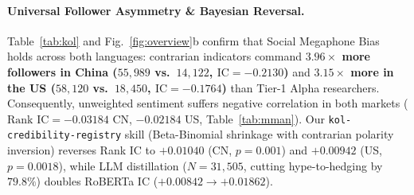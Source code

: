 \begin{table}[t]
\centering
{}
\vspace{-0.16cm}
\caption{Out-of-sample predictive ablation across China Xueqiu ($334{,}946$ samples) and US StockTwits ($214{,}820$ samples). Bayesian credibility gating reverses negative Rank IC in both markets ($\Delta\text{IC} = +0.0422$ CN, $+0.0313$ US, $p < 0.002$).}
\label{tab:mman}
\vspace{-0.24cm}
\end{table}

\paragraph{Universal Follower Asymmetry \& Bayesian Reversal.}
Table~\ref{tab:kol} and Fig.~\ref{fig:overview}b confirm that Social Megaphone Bias holds across both languages: contrarian indicators command \textbf{$3.96\times$ more followers in China ($55{,}989$ vs.\ $14{,}122$, $\text{IC} = -0.2130$)} and \textbf{$3.15\times$ more in the US ($58{,}120$ vs.\ $18{,}450$, $\text{IC} = -0.1764$)} than Tier-1 Alpha researchers. Consequently, unweighted sentiment suffers negative correlation in both markets ($\text{Rank IC} = -0.03184$ CN, $-0.02184$ US, Table~\ref{tab:mman}). Our \texttt{kol-\allowbreak credibility-\allowbreak registry} skill (Beta-Binomial shrinkage with contrarian polarity inversion) reverses Rank IC to $+0.01040$ (CN, $p = 0.001$) and $+0.00942$ (US, $p = 0.0018$), while LLM distillation ($N=31{,}505$, cutting hype-to-hedging by $79.8\%$) doubles RoBERTa IC ($+0.00842 \to +0.01862$).

